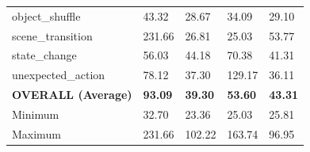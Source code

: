 \documentclass[conference]{IEEEtran}
\begin{document}
\begin{table}[!t]
\begin{tabularx}{\textwidth}{>{\raggedright\arraybackslash}p{4.5cm} YYYY}
    object\_shuffle            & 43.32  & 28.67  & 34.09  & 29.10  \\
    scene\_transition          & 231.66 & 26.81  & 25.03  & 53.77  \\
    state\_change              & 56.03  & 44.18  & 70.38  & 41.31  \\
    unexpected\_action          & 78.12  & 37.30  & 129.17 & 36.11  \\
    \midrule
    \textbf{OVERALL (Average)} & \textbf{93.09} & \textbf{39.30} & \textbf{53.60} & \textbf{43.31} \\
    Minimum                    & 32.70  & 23.36  & 25.03  & 25.81  \\
    Maximum                    & 231.66 & 102.22 & 163.74 & 96.95  \\
    \bottomrule
  \end{tabularx}
\end{table}
\end{document}
